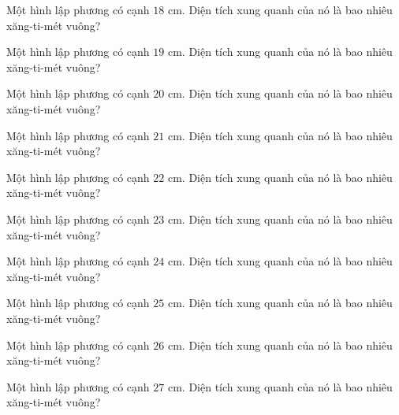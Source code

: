 \begin{ex}
  Một hình lập phương có cạnh $18\text{ cm}$. Diện tích xung quanh của nó là bao nhiêu xăng-ti-mét vuông?
\end{ex}

\begin{ex}
  Một hình lập phương có cạnh $19\text{ cm}$. Diện tích xung quanh của nó là bao nhiêu xăng-ti-mét vuông?
\end{ex}

\begin{ex}
  Một hình lập phương có cạnh $20\text{ cm}$. Diện tích xung quanh của nó là bao nhiêu xăng-ti-mét vuông?
\end{ex}

\begin{ex}
  Một hình lập phương có cạnh $21\text{ cm}$. Diện tích xung quanh của nó là bao nhiêu xăng-ti-mét vuông?
\end{ex}

\begin{ex}
  Một hình lập phương có cạnh $22\text{ cm}$. Diện tích xung quanh của nó là bao nhiêu xăng-ti-mét vuông?
\end{ex}

\begin{ex}
  Một hình lập phương có cạnh $23\text{ cm}$. Diện tích xung quanh của nó là bao nhiêu xăng-ti-mét vuông?
\end{ex}

\begin{ex}
  Một hình lập phương có cạnh $24\text{ cm}$. Diện tích xung quanh của nó là bao nhiêu xăng-ti-mét vuông?
\end{ex}

\begin{ex}
  Một hình lập phương có cạnh $25\text{ cm}$. Diện tích xung quanh của nó là bao nhiêu xăng-ti-mét vuông?
\end{ex}

\begin{ex}
  Một hình lập phương có cạnh $26\text{ cm}$. Diện tích xung quanh của nó là bao nhiêu xăng-ti-mét vuông?
\end{ex}

\begin{ex}
  Một hình lập phương có cạnh $27\text{ cm}$. Diện tích xung quanh của nó là bao nhiêu xăng-ti-mét vuông?
\end{ex}
